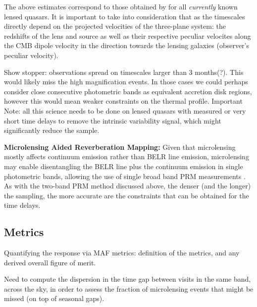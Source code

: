 The above estimates correspond to those obtained by \citet{MosqueraandKochanek2011} for all \emph{currently} known lensed quasars. It is important to take into consideration that as the timescales directly depend on the projected velocities of the three-plane system: the redshifts of the lens and source as well as their respective peculiar velocites along the CMB dipole velocity in the direction towards the lensing galaxies (observer's peculiar velocity).


Show stopper: observations spread on timescales larger than 3 months(?).
This would likely miss the high magnification events. In those cases
we could perhaps consider close consecutive photometric bands as
equivalent accretion disk regions, however this would mean weaker
constraints on the thermal profile.
%
Important Note: all this science needs to be done on lensed quasars
with measured or very short time delays to remove the intrinsic
variability signal, which might significantly reduce the sample.

{\bf Microlensing Aided Reverberation Mapping:} Given that
microlensing mostly affects continuum emission rather than BELR line
emission, microlensing may enable disentangling the BELR line plus the
continuum emission in single photometric bands, allowing the use of
single broad band PRM measurements \citep{SluseandTewes2014}. As with
the two-band PRM method discussed above, the denser (and the longer)
the sampling, the more accurate are the constraints that can be
obtained for the time delays.


\subsection{Metrics}
\label{sec:\secname:metrics}

Quantifying the response via MAF metrics: definition of the metrics,
and any derived overall figure of merit.

Need to compute the dispersion in the time gap
between visits in the same band, across the sky, in order to assess
the fraction of microlensing events that might be missed (on top of
seasonal gaps).



